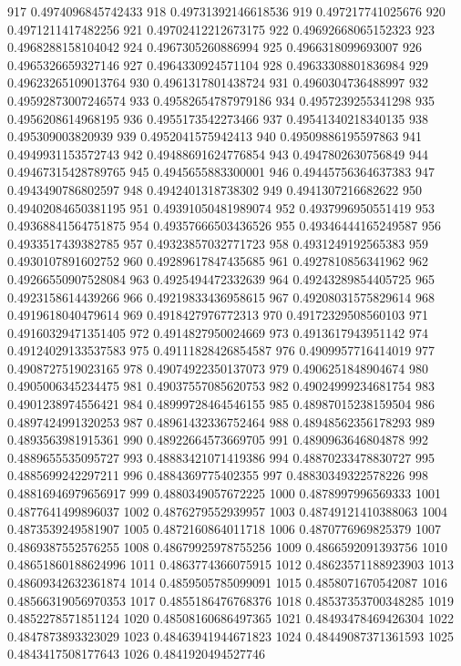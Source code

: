 917 0.4974096845742433
918 0.49731392146618536
919 0.497217741025676
920 0.4971211417482256
921 0.49702412212673175
922 0.49692668065152323
923 0.4968288158104042
924 0.4967305260886994
925 0.4966318099693007
926 0.4965326659327146
927 0.4964330924571104
928 0.49633308801836984
929 0.49623265109013764
930 0.4961317801438724
931 0.4960304736488997
932 0.49592873007246574
933 0.49582654787979186
934 0.4957239255341298
935 0.4956208614968195
936 0.4955173542273466
937 0.49541340218340135
938 0.495309003820939
939 0.4952041575942413
940 0.49509886195597863
941 0.4949931153572743
942 0.49488691624776854
943 0.4947802630756849
944 0.49467315428789765
945 0.4945655883300001
946 0.49445756364637383
947 0.4943490786802597
948 0.4942401318738302
949 0.4941307216682622
950 0.49402084650381195
951 0.49391050481989074
952 0.4937996950551419
953 0.49368841564751875
954 0.49357666503436526
955 0.49346444165249587
956 0.4933517439382785
957 0.49323857032771723
958 0.4931249192565383
959 0.4930107891602752
960 0.49289617847435685
961 0.4927810856341962
962 0.49266550907528084
963 0.4925494472332639
964 0.49243289854405725
965 0.4923158614439266
966 0.49219833436958615
967 0.49208031575829614
968 0.4919618040479614
969 0.4918427976772313
970 0.49172329508560103
971 0.49160329471351405
972 0.4914827950024669
973 0.4913617943951142
974 0.49124029133537583
975 0.49111828426854587
976 0.4909957716414019
977 0.4908727519023165
978 0.49074922350137073
979 0.4906251848904674
980 0.4905006345234475
981 0.49037557085620753
982 0.49024999234681754
983 0.4901238974556421
984 0.48999728464546155
985 0.48987015238159504
986 0.4897424991320253
987 0.48961432336752464
988 0.48948562356178293
989 0.4893563981915361
990 0.48922664573669705
991 0.4890963646804878
992 0.4889655535095727
993 0.48883421071419386
994 0.48870233478830727
995 0.4885699242297211
996 0.4884369775402355
997 0.48830349322578226
998 0.48816946979656917
999 0.4880349057672225
1000 0.4878997996569333
1001 0.4877641499896037
1002 0.4876279552939957
1003 0.48749121410388063
1004 0.4873539249581907
1005 0.4872160864011718
1006 0.4870776969825379
1007 0.4869387552576255
1008 0.48679925978755256
1009 0.4866592091393756
1010 0.48651860188624996
1011 0.4863774366075915
1012 0.48623571188923903
1013 0.48609342632361874
1014 0.4859505785099091
1015 0.4858071670542087
1016 0.48566319056970353
1017 0.4855186476768376
1018 0.48537353700348285
1019 0.4852278571851124
1020 0.48508160686497365
1021 0.48493478469426304
1022 0.4847873893323029
1023 0.48463941944671823
1024 0.48449087371361593
1025 0.4843417508177643
1026 0.4841920494527746
